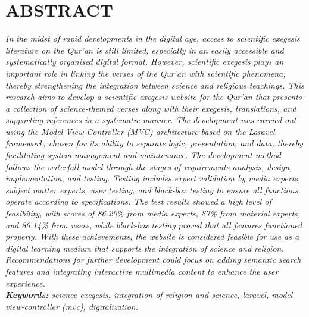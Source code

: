 \chapter*{ABSTRACT}

\textit{In the midst of rapid developments in the digital age, access to scientific exegesis literature on the Qur'an is still limited, especially in an easily accessible and systematically organised digital format. However, scientific exegesis plays an important role in linking the verses of the Qur'an with scientific phenomena, thereby strengthening the integration between science and religious teachings. This research aims to develop a scientific exegesis website for the Qur'an that presents a collection of science-themed verses along with their exegesis, translations, and supporting references in a systematic manner. The development was carried out using the Model-View-Controller (MVC) architecture based on the Laravel framework, chosen for its ability to separate logic, presentation, and data, thereby facilitating system management and maintenance. The development method follows the waterfall model through the stages of requirements analysis, design, implementation, and testing. Testing includes expert validation by media experts, subject matter experts, user testing, and black-box testing to ensure all functions operate according to specifications. The test results showed a high level of feasibility, with scores of 86.20\% from media experts, 87\% from material experts, and 86.14\% from users, while black-box testing proved that all features functioned properly. With these achievements, the website is considered feasible for use as a digital learning medium that supports the integration of science and religion. Recommendations for further development could focus on adding semantic search features and integrating interactive multimedia content to enhance the user experience.}\\	%

\noindent\textit{\textbf{Keywords:} science exegesis, integration of religion and science, laravel, model-view-controller (mvc), digitalization.}\\	%



